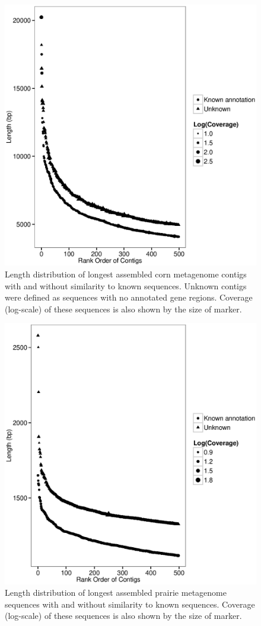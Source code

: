 \documentclass{pnastwo}
\begin{document}
\begin{figure}
\begin{center}
\centerline{\includegraphics[width=.7\textwidth]{./figures/corn-cov-len-500.eps}}
\caption{Length distribution of longest assembled corn metagenome contigs with and without similarity to known sequences.  Unknown contigs were defined as sequences with no annotated gene regions.  Coverage (log-scale) of these sequences is also shown by the size of marker. }
\label{cornlength}
\end{center}
\end{figure}

\begin{figure}
\begin{center}
\centerline{\includegraphics[width=.7\textwidth]{./figures/prairie-cov-len-500.eps}}
\caption{Length distribution of longest assembled prairie metagenome sequences with and without similarity to known sequences.  Coverage (log-scale) of these sequences is also shown by the size of marker. }
\label{prairielength}
\end{center}
\end{figure}
\end{document}
